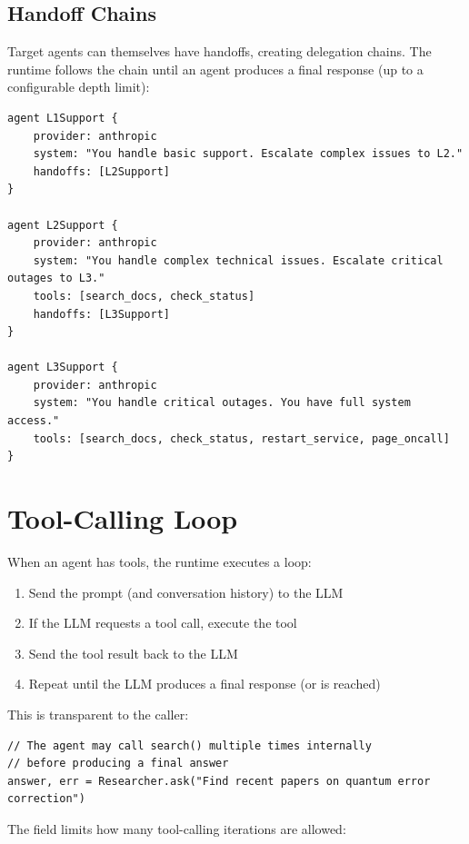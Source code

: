 \subsection{Handoff Chains}

Target agents can themselves have handoffs, creating delegation chains. The runtime follows the chain until an agent produces a final response (up to a configurable depth limit):

\begin{lstlisting}
agent L1Support {
    provider: anthropic
    system: "You handle basic support. Escalate complex issues to L2."
    handoffs: [L2Support]
}

agent L2Support {
    provider: anthropic
    system: "You handle complex technical issues. Escalate critical outages to L3."
    tools: [search_docs, check_status]
    handoffs: [L3Support]
}

agent L3Support {
    provider: anthropic
    system: "You handle critical outages. You have full system access."
    tools: [search_docs, check_status, restart_service, page_oncall]
}
\end{lstlisting}

\section{Tool-Calling Loop}

When an agent has tools, the runtime executes a loop:

\begin{enumerate}
    \item Send the prompt (and conversation history) to the LLM
    \item If the LLM requests a tool call, execute the tool
    \item Send the tool result back to the LLM
    \item Repeat until the LLM produces a final response (or  is reached)
\end{enumerate}

This is transparent to the caller:

\begin{lstlisting}
// The agent may call search() multiple times internally
// before producing a final answer
answer, err = Researcher.ask("Find recent papers on quantum error correction")
\end{lstlisting}

The  field limits how many tool-calling iterations are allowed:


